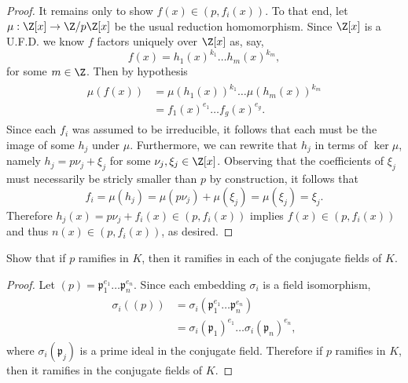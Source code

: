 \documentclass[10pt]{amsart}
\begin{document}
\begin{thm}
\begin{proof}
  It remains only to show $f(x) \in (p, f_i(x))$.
  To that end, let $\mu: \Z[x] \rightarrow \Z/p\Z[x]$ be the usual reduction homomorphism.
  Since $\Z[x]$ is a U.F.D. we know $f$ factors uniquely over $\Z[x]$ as, say, $$f(x) = h_1(x)^{k_1}\ldots h_m(x)^{k_m},$$
  for some $m \in \Z$.
  Then by hypothesis
  \begin{align*}
    \begin{split}
      \mu(f(x)) &= \mu(h_1(x))^{k_1}\ldots \mu(h_m(x))^{k_m} \\
      &= f_1(x)^{e_1}\ldots f_g(x)^{e_g}.
    \end{split}
  \end{align*}
  Since each $f_i$ was assumed to be irreducible, it follows that each must be the image of some $h_j$ under $\mu$.
  Furthermore, we can rewrite that $h_j$ in terms of $\ker{\mu}$, namely $h_j = p\nu_j + \xi_j$ for some $\nu_j, \xi_j \in \Z[x]$.
  Observing that the coefficients of $\xi_j$ must necessarily be stricly smaller than $p$ by construction, it follows that 
  $$f_i = \mu(h_j) = \mu(p\nu_j) +\mu(\xi_j) = \mu(\xi_j) = \xi_j.$$
  Therefore $h_j(x) = p\nu_j + f_i(x) \in (p, f_i(x))$ implies $f(x) \in (p,f_i(x))$ and thus $n(x) \in (p, f_i(x))$, as desired.
\end{proof}
\end{thm}

\begin{thm}
  \newcommand{\pp}{\mathfrak{p}}
  \label{Ex2}
  Show that if $p$ ramifies in $K$, then it ramifies in each of the conjugate fields of $K$.
  \begin{proof}
    Let $(p) = \pp_1^{e_1}\ldots\pp_n^{e_n}.$
    Since each embedding $\sigma_i$ is a field isomorphism, 
    \begin{align*}
      \begin{split}
        \sigma_i((p)) &= \sigma_i(\pp_1^{e_1}\ldots\pp_n^{e_n})\\
        &= \sigma_i(\pp_1)^{e_1}\ldots\sigma_i(\pp_n)^{e_n},
        \end{split}
      \end{align*}
      where $\sigma_i(\pp_j)$ is a prime ideal in the conjugate field.
      Therefore if $p$ ramifies in $K$, then it ramifies in the conjugate fields of $K$.
  \end{proof}
\end{thm}
\end{document}
